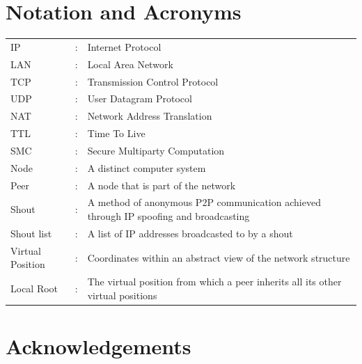 \documentclass[ %
                    author={Luke Murray},
                supervisor={Dr. Simon Hollis},
                     title={Shadow Peer-to-Peer Networks},
                  subtitle={},
                    degree={MEng},
                      year={2013} ]{thesis}
\begin{document}

\chapter*{Notation and Acronyms}

\begin{tabular}{lcl}
IP                &:     & Internet Protocol\\
LAN               &:     & Local Area Network\\
TCP               &:     & Transmission Control Protocol\\
UDP               &:     & User Datagram Protocol\\
NAT               &:     & Network Address Translation\\
TTL               &:     & Time To Live\\
SMC               &:     & Secure Multiparty Computation\\

Node              &:     & A distinct computer system\\
Peer              &:     & A node that is part of the network\\
Shout             &:     & A method of anonymous P2P communication achieved through IP spoofing and broadcasting\\
Shout list        &:     & A list of IP addresses broadcasted to by a shout\\
Virtual Position  &:     & Coordinates within an abstract view of the network structure\\
Local Root        &:     & The virtual position from which a peer inherits all its other virtual positions\\

\end{tabular}


\chapter*{Acknowledgements}

\end{document}
